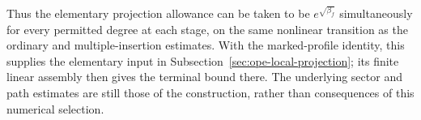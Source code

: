 Thus the elementary projection allowance can be taken to be
$e^{\sqrt{\beta_f}}$ simultaneously for every permitted degree at
each stage, on the same nonlinear transition as the ordinary and
multiple-insertion estimates. With the marked-profile identity,
this supplies the elementary input in
Subsection~\ref{sec:ope-local-projection}; its finite linear assembly
then gives the terminal bound there. The underlying sector and
path estimates are still those of the construction, rather than
consequences of this numerical selection.
